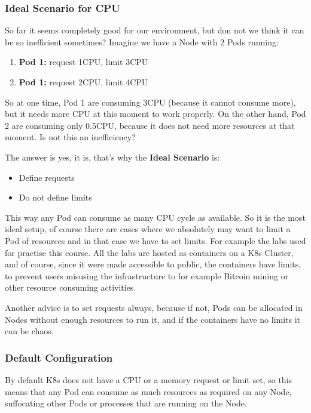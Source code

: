 \documentclass{article}
\begin{document}
\subsubsection{Ideal Scenario for CPU}
So far it seems completely good for our environment, but don not we think it can be so inefficient sometimes? Imagine we have a Node with 2 Pods running:
\begin{enumerate}
    \item \textbf{Pod 1:} request 1CPU, limit 3CPU
    \item \textbf{Pod 1:} request 2CPU, limit 4CPU
\end{enumerate}

So at one time, Pod 1 are consuming 3CPU (because it cannot consume more), but it needs more CPU at this moment to work properly. On the other hand, Pod 2 are consuming only 0.5CPU, because it does not need more resources at that moment. Is not this an inefficiency?

The answer is yes, it is, that's why the \textbf{Ideal Scenario} is:
\begin{itemize}
    \item Define requests
    \item Do not define limits
\end{itemize}

This way any Pod can consume as many CPU cycle as available. So it is the most ideal setup, of course there are cases where we absolutely may want to limit a Pod of resources and in that case we have to set limits. For example the labs used for practise this course. All the labs are hosted as containers on a K8s Cluster, and of course, since it were made accessible to public, the containers have limits, to prevent users misusing the infrastructure to for example Bitcoin mining or other resource consuming activities.

Another advice is to set requests always, because if not, Pods can be allocated in Nodes without enough resources to run it, and if the containers have no limits it can be chaos.


\subsubsection{Default Configuration}

By default K8s does not have a CPU or a memory request or limit set, so this means that any Pod can consume as much resources as required on any Node, suffocating other Pods or processes that are running on the Node.
\end{document}
